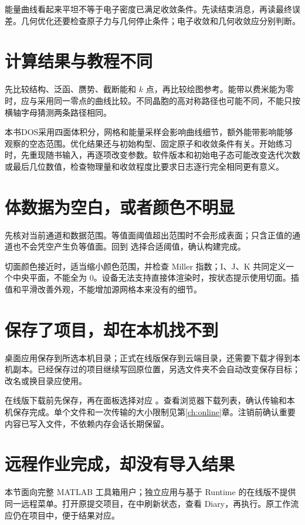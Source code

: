 能量曲线看起来平坦不等于电子密度已满足收敛条件。先读结束消息，再读最终误差。几何优化还要检查原子力与几何停止条件；电子收敛和几何收敛应分别判断。

\section{计算结果与教程不同}

先比较结构、泛函、赝势、截断能和 $k$ 点，再比较绘图参考。能带以费米能为零时，应与采用同一零点的曲线比较。不同晶胞的高对称路径也可能不同，不能只按横轴字母猜测两条路径相同。

本书DOS采用四面体积分，网格和能量采样会影响曲线细节，额外能带影响能够观察的空态范围。优化结果还与初始构型、固定原子和收敛条件有关。开始练习时，先重现随书输入，再逐项改变参数。软件版本和初始电子态可能改变迭代次数或最后几位数值，检查物理量和收敛程度比要求日志逐行完全相同更有意义。

\section{体数据为空白，或者颜色不明显}

先核对当前通道和数据范围。等值面阈值超出范围时不会形成表面；只含正值的通道也不会凭空产生负等值面。回到  选择合适阈值，确认构建完成。

切面颜色接近时，适当缩小颜色范围，并检查 Miller 指数；I、J、K 共同定义一个中央平面，不能全为 0。设备无法支持直接体渲染时，按状态提示使用切面。插值和平滑改善外观，不能增加源网格本来没有的细节。

\section{保存了项目，却在本机找不到}

桌面应用保存到所选本机目录；正式在线版保存到云端目录，还需要下载才得到本机副本。已经保存过的项目继续写回原位置，另选文件夹不会自动改变保存目标；改名或换目录应使用。

在线版下载前先保存，再在面板选择对应 。查看浏览器下载列表，确认传输和本机保存完成。单个文件和一次传输的大小限制见第\ref{ch:online}章。注销前确认重要内容已写入文件，不依赖内存会话长期保留。

\section{远程作业完成，却没有导入结果}

本节面向完整 MATLAB\regmark{} 工具箱用户；独立应用与基于 Runtime 的在线版不提供同一远程菜单。打开原提交项目，在中刷新状态，查看 Diary，再执行。原工作流应仍在项目中，便于结果对应。

